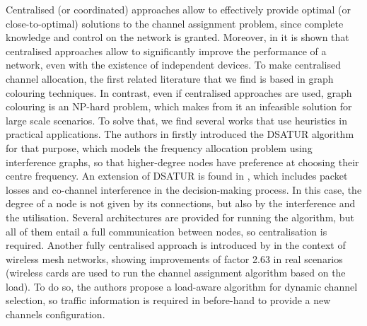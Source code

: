 \documentclass[12pt, a4paper,twoside]{tesi_upf}
\begin{document}
			Centralised (or coordinated) approaches allow to effectively provide optimal (or close-to-optimal) solutions to the channel assignment problem, since complete knowledge and control on the network is granted. Moreover, in \cite{baid2015understanding} it is shown that centralised approaches allow to significantly improve the performance of a network, even with the existence of independent devices. To make centralised channel allocation, the first related literature that we find is based in graph colouring techniques. In contrast, even if centralised approaches are used, graph colouring is an NP-hard problem, which makes from it an infeasible solution for large scale scenarios. To solve that, we find several works that use heuristics in practical applications. The authors in \cite{brelaz1979new} firstly introduced the DSATUR algorithm for that purpose, which models the frequency allocation problem using interference graphs, so that higher-degree nodes have preference at choosing their centre frequency. An extension of DSATUR is found in \cite{villegas2009frequency}, which includes packet losses and co-channel interference in the decision-making process. In this case, the degree of a node is not given by its connections, but also by the interference and the utilisation. Several architectures are provided for running the algorithm, but all of them entail a full communication between nodes, so centralisation is required. Another fully centralised approach is introduced by \cite{raniwala2004centralized} in the context of wireless mesh networks, showing improvements of factor 2.63 in real scenarios (wireless cards are used to run the channel assignment algorithm based on the load). To do so, the authors propose a load-aware algorithm for dynamic channel selection, so traffic information is required in before-hand to provide a new channels configuration. 
			
\end{document}
